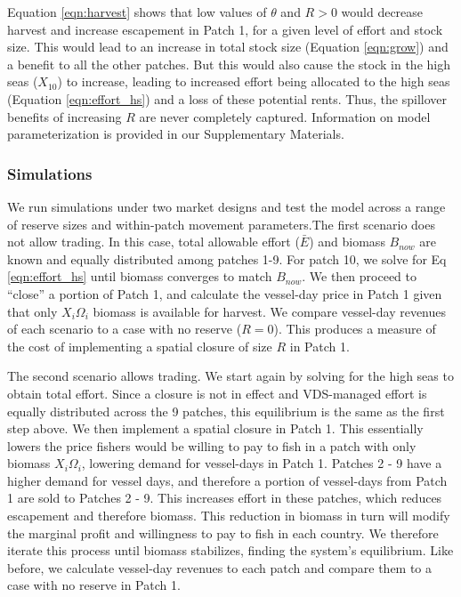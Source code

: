 \documentclass[12pt]{article}
\begin{document}
\noindent Equation \ref{eqn:harvest} shows that low values of $\theta$ and $R > 0$ would decrease harvest and increase escapement in Patch 1, for a given level of effort and stock size. This would lead to an increase in total stock size (Equation \ref{eqn:grow}) and a benefit to all the other patches. But this would also cause the stock in the high seas ($X_{10}$) to increase, leading to increased effort being allocated to the high seas (Equation \ref{eqn:effort_hs}) and a loss of these potential rents. Thus, the spillover benefits of increasing $R$ are never completely captured. Information on model parameterization is provided in our Supplementary Materials.

\subsubsection{Simulations}

We run simulations under two market designs and test the model across a range of reserve sizes and within-patch movement parameters.The first scenario does not allow trading. In this case, total allowable effort ($\bar{E}$) and biomass $B_{now}$ are known and equally distributed among patches 1-9. For patch 10, we solve for Eq \ref{eqn:effort_hs} until biomass converges to match $B_{now}$. We then proceed to ``close'' a portion of Patch 1, and calculate the vessel-day price in Patch 1 given that only $X_i\Omega_i$ biomass is available for harvest. We compare vessel-day revenues of each scenario to a case with no reserve ($R = 0$). This produces a measure of the cost of implementing a spatial closure of size $R$ in Patch 1.

The second scenario allows trading. We start again by solving for the high seas to obtain total effort. Since a closure is not in effect and VDS-managed effort is equally distributed across the 9 patches, this equilibrium is the same as the first step above. We then implement a spatial closure in Patch 1. This essentially lowers the price fishers would be willing to pay to fish in a patch with only biomass $X_i\Omega_i$, lowering demand for vessel-days in Patch 1. Patches 2 - 9 have a higher demand for vessel days, and therefore a portion of vessel-days from Patch 1 are sold to Patches 2 - 9. This increases effort in these patches, which reduces escapement and therefore biomass. This reduction in biomass in turn will modify the marginal profit and willingness to pay to fish in each country. We therefore iterate this process until biomass stabilizes, finding the system's equilibrium. Like before, we calculate vessel-day revenues to each patch and compare them to a case with no reserve in Patch 1.
\end{document}
